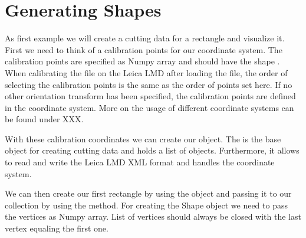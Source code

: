 \documentclass[a4paper,10pt,english,openany,oneside]{sphinxmanual}
\begin{document}
\section{Generating Shapes}
\label{\detokenize{pages/quickstart:generating-shapes}}
\sphinxAtStartPar
As first example we will create a cutting data for a rectangle and visualize it. First we need to think of a calibration points for our coordinate system.  The calibration points are specified as Numpy array and should have the shape . When calibrating the file on the Leica LMD after loading the file, the order of selecting the calibration points is the same as the order of points set here. If no other orientation transform has been specified,  the calibration points are defined in the  coordinate system. More on the usage of different coordinate systems can be found under XXX.

\begin{sphinxVerbatim}[commandchars=\\\{\}]
   
    

  \PYG{p}{[}\PYG{p}{[} \PYG{p}{]}
                        \PYG{p}{[} \PYG{p}{]}
                        \PYG{p}{[} \PYG{p}{]}\PYG{p}{]}
\end{sphinxVerbatim}

\sphinxAtStartPar
With these calibration coordinates we can create our  object. The  is the base object for creating cutting data and holds a list of  objects. Furthermore, it allows to read and write the Leica LMD XML format and handles the coordinate system.

\begin{sphinxVerbatim}[commandchars=\\\{\}]
    
\end{sphinxVerbatim}

\sphinxAtStartPar
We can then create our first rectangle by using the  object and passing it to our collection by using the  method. For creating the Shape object we need to pass the vertices as Numpy array. List of vertices should always be closed with the last vertex equaling the first one.
\end{document}
